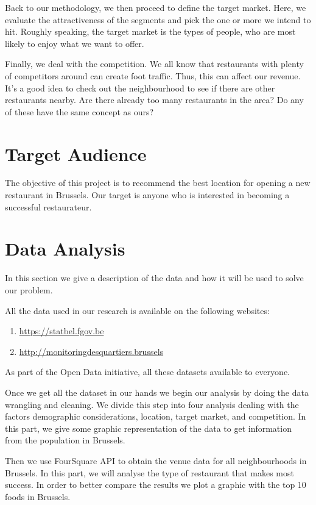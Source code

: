 \documentclass[a4paper,11pt]{amsart}
\begin{document}
Back to our methodology, we then proceed to define the target market. Here, we evaluate the attractiveness of the segments and pick the one or more we intend to hit. Roughly speaking, the target market is the types of people, who are most likely to enjoy what we want to offer. 

Finally, we deal with the competition. We all know that restaurants with plenty of competitors around can create foot traffic. Thus, this can affect our revenue. It’s a good idea to check out the neighbourhood to see if there are other restaurants nearby. Are there already too many restaurants in the area? Do any of these have the same concept as ours?

\section{Target Audience}

The objective of this project is to recommend the best location for opening a new restaurant in Brussels. Our target is anyone who is interested in becoming a successful restaurateur. 

\section{Data Analysis}
In this section we give a description of the data and how it will be used to solve our problem.

All the data used in our research is available on the following websites: 
\begin{enumerate}[$\diamond$]
\item \href{https://statbel.fgov.be/en}{https://statbel.fgov.be}
\item \href{http://monitoringdesquartiers.brussels}{http://monitoringdesquartiers.brussels}
\end{enumerate}
As part of the Open Data initiative, all these datasets available to everyone. 

Once we get all the dataset in our hands we begin our analysis by doing the data wrangling and cleaning. We divide this step into four analysis dealing with the factors demographic considerations, location, target market, and competition. In this part, we give some graphic representation of the data to get information from the population in Brussels. 

Then we use FourSquare API to obtain the venue data for all neighbourhoods in Brussels. In this part, we will analyse the type of restaurant that makes most success. In order to better compare the results we plot a graphic with the top 10 foods in Brussels. 
\end{document}
